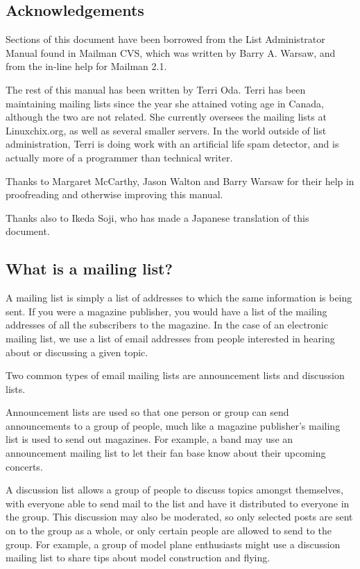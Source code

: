 \documentclass{howto}
\begin{document}
\subsection{Acknowledgements}

Sections of this document have been borrowed from the List Administrator Manual
found in Mailman CVS, which was written by Barry A. Warsaw, and from the in-line
help for Mailman 2.1.  

The rest of this manual has been written by Terri Oda.
Terri has been maintaining mailing lists since the year she attained 
voting age in Canada, although the two are not related.  She currently 
oversees the mailing lists at Linuxchix.org, as well as several smaller 
servers.  In the world outside of list administration, Terri is doing 
work with an artificial life spam detector, and is actually more of a 
programmer than technical writer.

Thanks to Margaret McCarthy, Jason Walton and Barry Warsaw for their help 
in proofreading and otherwise improving this manual.  

Thanks also to Ikeda Soji, who has made a Japanese translation of this document.


\subsection{What is a mailing list?}

A mailing list is simply a list of addresses to which the same information
is being sent.  If you were a magazine publisher, you would have a list of
the mailing addresses of all the subscribers to the magazine.  In the case
of an electronic mailing list, we use a list of email addresses from people
interested in hearing about or discussing a given topic.  

Two common types of email mailing lists are announcement lists and discussion 
lists.  

Announcement lists are used so that one person or group can send
announcements to a group of people, much like a magazine publisher's mailing
list is used to send out magazines.  For example, a band may use an
announcement mailing list to let their fan base know about their upcoming
concerts.


A discussion list allows a group of people to discuss topics amongst
themselves, with everyone able to send mail to the list and have it distributed
to everyone in the group.  This discussion may also be moderated, so only
selected posts are sent on to the group as a whole, or only certain people are
allowed to send to the group.  For example, a group of model plane enthusiasts
might use a discussion mailing list to share tips about model construction and
flying.
\end{document}
